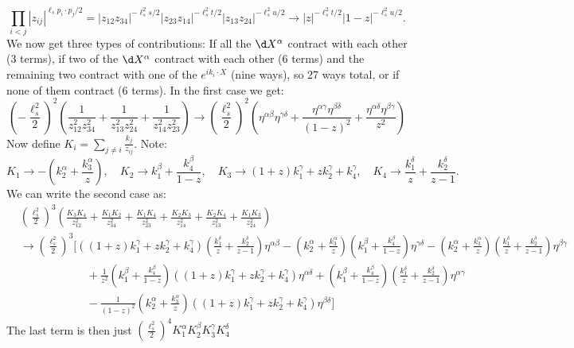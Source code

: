 	\[
		\prod_{i<j} |z_{ij}|^{\ell_s p_i \cdot p_j/2} = |z_{12} z_{34}|^{-\ell_s^2 s/2} |z_{23} z_{14}|^{-\ell_s^2 t/2} |z_{13} z_{24}|^{-\ell_s^2 u/2} \to |z|^{-\ell_s^2 t/2} |1-z|^{-\ell_s^2 u/2}.
	\]
	We now get three types of contributions: If all the $\d X^\alpha$ contract with each other (3 terms), if two of the $\d X^\alpha$ contract with each other (6 terms) and the remaining two contract with one of the $e^{i k_i \cdot X}$ (nine ways), so 27 ways total, or if none of them contract (6 terms). 
	In the first case we get:
	\[
		\left(-\frac{\ell_s^2}{2}\right)^2 \left(\frac{1}{z_{12}^2 z_{34}^2} + \frac{1}{z_{13}^2 z_{24}^2} + \frac{1}{z_{14}^2 z_{23}^2} \right) \to \left(\frac{\ell_s^2}{2}\right)^2 \left(\eta^{\alpha \beta} \eta^{\gamma \delta} + \frac{\eta^{\alpha \gamma} \eta^{\beta \delta}}{(1-z)^{2}} + \frac{\eta^{\alpha \delta} \eta^{\beta \gamma}}{z^{2}} \right)  %
	\]
	Now define $K_i = \sum_{j \neq i} \tfrac{k_j}{z_{ij}}$. Note:
	\[
		K_1 \to -(k_2^\alpha + \frac{k_3^\alpha}{z}), 
		\quad K_2 \to k_1^\beta + \frac{k_4^\beta}{1-z}, 
		\quad K_3 \to (1+z)k_1^\gamma + z k_2^\gamma + k_4^\gamma, 
		\quad K_4 \to \frac{k_1^\delta}{z} + \frac{k_2^\delta}{z-1}.
	\]
	 We can write the second case as:
	\[
	\begin{aligned}
		&\left(\frac{\ell_s^2}{2}\right)^3 \left(\frac{K_3 K_4}{z_{12}^2} + \frac{K_1 K_2}{z_{34}^2} + \frac{K_1 K_4}{z_{23}^2} + \frac{K_2 K_3}{z_{14}^2} + \frac{K_2 K_4}{z_{13}^2} + \frac{K_1 K_3}{z_{24}^2} \right) \\
		& \to \left(\frac{\ell_s^2}{2}\right)^3 \Big[
		((1+z)k_1^\gamma + z k_2^\gamma + k_4^\gamma)(\tfrac{k_1^\delta}{z} + \tfrac{k_2^\delta}{z-1}) \eta^{\alpha \beta}
		-(k_2^\alpha + \tfrac{k_3^\alpha}{z})(k_1^\beta + \tfrac{k_4^\beta}{1-z}) \eta^{\gamma \delta}
		-(k_2^\alpha + \tfrac{k_3^\alpha}{z})(\tfrac{k_1^\delta}{z} + \tfrac{k_2^\delta}{z-1}) \eta^{\beta \gamma}
		\\ & \qquad \qquad \qquad + \tfrac{1}{z^2}(k_1^\beta + \tfrac{k_4^\beta}{1-z}) ((1+z)k_1^\gamma + z k_2^\gamma + k_4^\gamma) \eta^{\alpha \delta}
		+ (k_1^\beta + \tfrac{k_4^\beta}{1-z}) (\tfrac{k_1^\delta}{z} + \tfrac{k_2^\delta}{z-1}) \eta^{\alpha \gamma}\\
		& \qquad \qquad \qquad - \tfrac{1}{(1-z)^2} (k_2^\alpha + \tfrac{k_3^\alpha}{z}) ((1+z)k_1^\gamma + z k_2^\gamma + k_4^\gamma) \eta^{\beta \delta}
		\Big]
	\end{aligned}
	\]
	The last term is then just $(\tfrac{\ell_s^2}{2})^4 K_1^\alpha K_2^\beta K_3^\gamma K_4^\delta$
	
